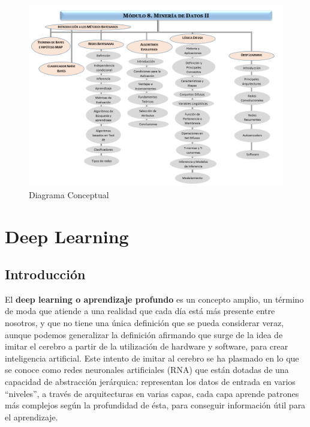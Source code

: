 \documentclass[
  a4paper,
  DIV=11,
  numbers=noendperiod]{scrreprt}
\begin{document}
\begin{figure}

{\centering \includegraphics[width=1\textwidth,height=\textheight]{imagenes/diagrama_conceptual.png}

}

\caption{\label{fig-diagrama-conceptual}Diagrama Conceptual}

\end{figure}


\hypertarget{deep-learning}{%
\chapter{Deep Learning}\label{deep-learning}}

\hypertarget{introducciuxf3n-1}{%
\section{Introducción}\label{introducciuxf3n-1}}

El \textbf{deep learning o aprendizaje profundo} es un concepto amplio,
un término de moda que atiende a una realidad que cada día está más
presente entre nosotros, y que no tiene una única definición que se
pueda considerar veraz, aunque podemos generalizar la definición
afirmando que surge de la idea de imitar el cerebro a partir de la
utilización de hardware y software, para crear inteligencia artificial.
Este intento de imitar al cerebro se ha plasmado en lo que se conoce
como redes neuronales artificiales (RNA) que están dotadas de una
capacidad de abstracción jerárquica: representan los datos de entrada en
varios ``niveles'', a través de arquitecturas en varias capas, cada capa
aprende patrones más complejos según la profundidad de ésta, para
conseguir información útil para el aprendizaje.
\end{document}
